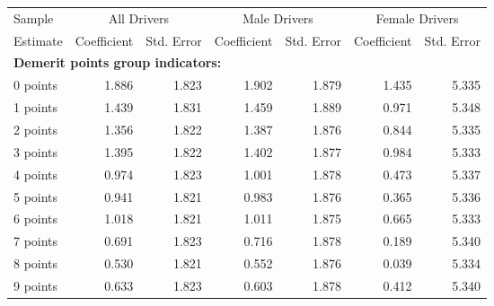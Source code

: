 
\begin{table}%
\centering 
\begin{tabular}{l r r r r r r} 

\hline 
 

Sample 
 & \multicolumn{2}{c}{All  Drivers}  & \multicolumn{2}{c}{Male  Drivers}  & \multicolumn{2}{c}{Female  Drivers}   \\ 
 

 \cmidrule(lr){1-1}\cmidrule(lr){2-3}\cmidrule(lr){4-5}\cmidrule(lr){6-7} 

Estimate  & Coefficient & Std. Error  & Coefficient & Std. Error  & Coefficient & Std. Error   \\ 
 

\hline 
 
\multicolumn{4}{l}{\textbf{Demerit points group indicators:}}  \\ 
 
0 points  &  1.886  &  1.823  &  1.902  &  1.879  &  1.435  &  5.335   \\ 
 
1 points  &  1.439  &  1.831  &  1.459  &  1.889  &  0.971  &  5.348   \\ 
 
2 points  &  1.356  &  1.822  &  1.387  &  1.876  &  0.844  &  5.335   \\ 
 
3 points  &  1.395  &  1.822  &  1.402  &  1.877  &  0.984  &  5.333   \\ 
 
4 points  &  0.974  &  1.823  &  1.001  &  1.878  &  0.473  &  5.337   \\ 
 
5 points  &  0.941  &  1.821  &  0.983  &  1.876  &  0.365  &  5.336   \\ 
 
6 points  &  1.018  &  1.821  &  1.011  &  1.875  &  0.665  &  5.333   \\ 
 
7 points  &  0.691  &  1.823  &  0.716  &  1.878  &  0.189  &  5.340   \\ 
 
8 points  &  0.530  &  1.821  &  0.552  &  1.876  &  0.039  &  5.334   \\ 
 
9 points  &  0.633  &  1.823  &  0.603  &  1.878  &  0.412  &  5.340   \\ 
 

\end{tabular}
\end{table}
